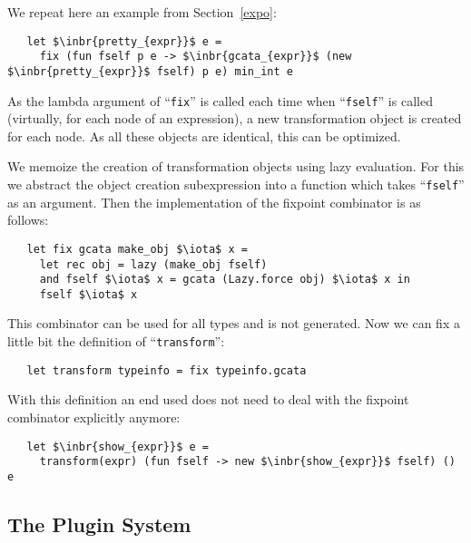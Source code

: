We repeat here an example from Section~\ref{expo}:

\begin{lstlisting}
   let $\inbr{pretty_{expr}}$ e =
     fix (fun fself p e -> $\inbr{gcata_{expr}}$ (new $\inbr{pretty_{expr}}$ fself) p e) min_int e
\end{lstlisting}

As the lambda argument of ``\lstinline{fix}'' is called each time when ``\lstinline{fself}'' is called (virtually, for each node of
an expression), a new transformation object is created for each node. As all these objects are identical, this can be optimized. 

We memoize the creation of transformation objects using lazy evaluation. For this we abstract the object creation subexpression into a
function which takes ``\lstinline{fself}'' as an argument. Then the implementation of the fixpoint combinator is as follows:

\begin{lstlisting}
   let fix gcata make_obj $\iota$ x =
     let rec obj = lazy (make_obj fself)
     and fself $\iota$ x = gcata (Lazy.force obj) $\iota$ x in
     fself $\iota$ x
\end{lstlisting}

This combinator can be used for all types and is not generated. Now we can fix a little bit the definition of ``\lstinline{transform}'':

\begin{lstlisting}
   let transform typeinfo = fix typeinfo.gcata
\end{lstlisting}

With this definition an end used does not need to deal with the fixpoint combinator explicitly anymore:

\begin{lstlisting}
   let $\inbr{show_{expr}}$ e =
     transform(expr) (fun fself -> new $\inbr{show_{expr}}$ fself) () e
\end{lstlisting}

\subsection{The Plugin System}
\label{plugins}

